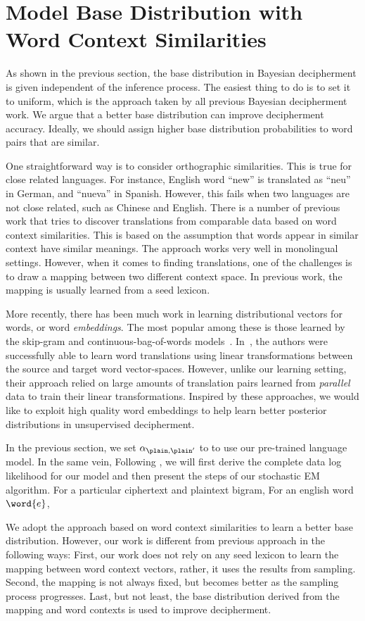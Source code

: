 \section{Model Base Distribution with Word Context Similarities}
As shown in the previous section, the base distribution in Bayesian decipherment is given independent of the inference process. The easiest thing to do is to set it to uniform, which is the approach taken by all previous Bayesian decipherment work. We argue that a better base distribution can improve decipherment accuracy. Ideally, we should assign higher base distribution probabilities to word pairs that are similar.

One straightforward way is to consider orthographic similarities. This is true for close related languages. For instance, English word ``new'' is translated as ``neu'' in German, and ``nueva'' in Spanish. However, this fails when two languages are not close related, such as Chinese and English. There is a number of previous work that tries to discover translations from comparable data based on word context similarities. This is based on the assumption that words appear in similar context have similar meanings. The approach works very well in monolingual settings. However, when it comes to finding translations, one of the challenges is to draw a mapping between two different context space. In previous work, the mapping is usually learned from a seed lexicon.

More recently, there has been much work in learning distributional vectors for words, or word \emph{embeddings}. The most popular among these is those learned by the skip-gram and continuous-bag-of-words models~\cite{mikolov2013efficient}. In~\cite{mikolov2013distributed}, the authors were successfully able to learn word translations using linear transformations between the source and target word vector-spaces. However, unlike our learning setting, their approach relied on large amounts of translation pairs learned from \emph{parallel} data to train their linear transformations. Inspired by these approaches, we would like to exploit high quality word embeddings to help learn better posterior distributions in unsupervised decipherment. 

In the previous section, we set $\alpha_{\plain,\plain'}$ to to use our pre-trained language model. In the same vein, Following \cite{mimno2012topic}, we will first derive the complete data log likelihood for our model and then present the steps of our stochastic EM algorithm. For a particular ciphertext and plaintext bigram, For an english word $\word{e}$, 

We adopt the approach based on word context similarities to learn a better base distribution. However, our work is different from previous approach in the following ways: First, our work does not rely on any seed lexicon to learn the mapping between word context vectors, rather, it uses the results from sampling. Second, the mapping is not always fixed, but becomes better as the sampling process progresses. Last, but not least, the base distribution derived from the mapping and word contexts is used to improve decipherment.


